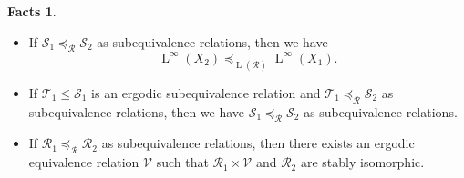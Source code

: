 \documentclass[11pt]{amsart}
\numberwithin{equation}{section}
\theoremstyle{plain}
\theoremstyle{definition}
\newtheorem{facts}[thm]{Facts}
\newcommand{\rL}{\operatorname{L}}
\begin{document}
\begin{facts}
\begin{itemize}
\item  [$(\rm iv)$] If $\mathscr S_1 \preceq_{\mathscr R} \mathscr S_2$ as subequivalence relations, then we have $$\rL^\infty(X_2) \preceq_{\rL(\mathscr R)} \rL^\infty(X_1).$$

\item [$(\rm v)$] If $\mathscr T_1 \leq \mathscr S_1$ is an ergodic subequivalence relation and $\mathscr T_1 \preceq_{\mathscr R} \mathscr S_2$ as subequivalence relations, then we have $\mathscr S_1 \preceq_{\mathscr R} \mathscr S_2$ as subequivalence relations. 

\item [$(\rm vi)$] If $\mathscr R_1 \preceq_{\mathscr R} \mathscr R_2$ as subequivalence relations, then there exists an ergodic equivalence relation $\mathscr V$ such that $\mathscr R_1 \times \mathscr V$ and $\mathscr R_2$ are stably isomorphic.
\end{itemize}
\end{facts}
\end{document}
